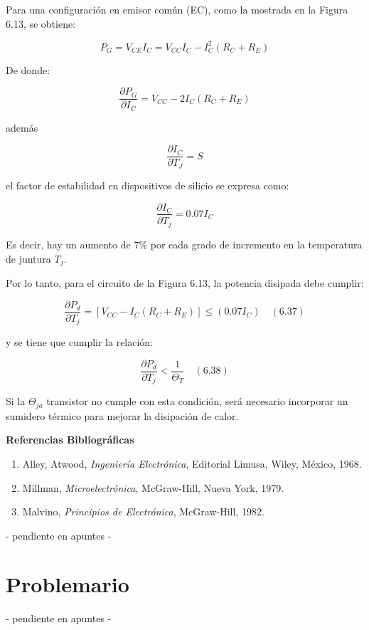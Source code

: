 Para una configuración en emisor común (EC), como la mostrada en la Figura 6.13, se obtiene:

\[
P_G = V_{CE} I_C = V_{CC} I_C - I_C^2 (R_C + R_E)
\]

De donde:

\[
\frac{\partial P_G}{\partial I_C} = V_{CC} - 2 I_C (R_C + R_E)
\]

además 

\[
\frac{\partial I_C}{\partial T_J} = S
\]

el factor de estabilidad en dispositivos de silicio se expresa como:

\[
\frac{\partial I_C}{\partial T_j} = 0.07 I_C
\]

Es decir, hay un aumento de \( 7\% \) por cada grado de incremento en la temperatura de juntura \( T_j \).

Por lo tanto, para el circuito de la Figura 6.13, la potencia disipada debe cumplir:

\begin{equation}
	\frac{\partial P_d}{\partial T_j} = \left[ V_{CC} - I_C (R_C + R_E) \right] \leq (0.07 I_C) \quad (6.37)
\end{equation}

y se tiene que cumplir la relación:

\begin{equation}
	\frac{\partial P_d}{\partial T_j} < \frac{1}{\Theta_T} \quad (6.38)
\end{equation}

Si la \( \Theta_{ja} \) transistor no cumple con esta condición, será necesario incorporar un sumidero térmico para mejorar la disipación de calor.

\textbf{Referencias Bibliográficas}

\begin{enumerate}
	\item Alley, Atwood, \textit{Ingeniería Electrónica}, Editorial Limusa, Wiley, México, 1968.
	\item Millman, \textit{Microelectrónica}, McGraw-Hill, Nueva York, 1979.
	\item Malvino, \textit{Principios de Electrónica}, McGraw-Hill, 1982.
\end{enumerate}

- pendiente en apuntes -

\section{Problemario} %
- pendiente en apuntes -	